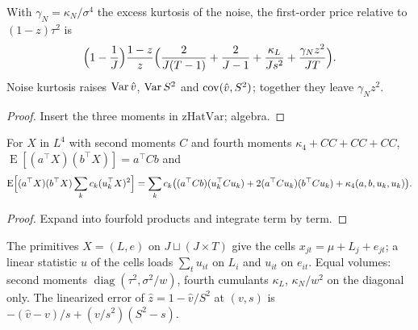 \begin{theorem}\label{thm:bsPrice_balanced_cumulants}
  \leanok
  With $\gamma_N = \kappa_N/\sigma^4$ the excess kurtosis of the noise, the first-order price relative to
  $(1 - z)\tau^2$ is
  \[ \Bigl(1 - \frac1J\Bigr)\frac{1 - z}z\Bigl(\frac2{J(T - 1)} + \frac2{J - 1} + \frac{\kappa_L}{Js^2}
     + \frac{\gamma_Nz^2}{JT}\Bigr). \]
  Noise kurtosis raises $\operatorname{Var}\hat v$, $\operatorname{Var} S^2$ and $\operatorname{cov}(\hat v, S^2)$; together they leave $\gamma_Nz^2$.
\end{theorem}
\begin{proof}
  \leanok
  Insert the three moments in $\mathrm{zHatVar}$; algebra.
\end{proof}

\begin{lemma}\label{lem:integral_lin_lin_sumSq}
  \leanok
  For $X$ in $L^4$ with second moments $C$ and fourth moments $\kappa_4 + CC + CC + CC$,
  $\operatorname{E}[(a^\top X)(b^\top X)] = a^\top Cb$ and
  \[ \operatorname{E}\Bigl[(a^\top X)(b^\top X)\sum_k c_k(u_k^\top X)^2\Bigr]
     = \sum_k c_k\bigl((a^\top Cb)(u_k^\top Cu_k) + 2(a^\top Cu_k)(b^\top Cu_k) + \kappa_4(a, b, u_k, u_k)\bigr). \]
\end{lemma}
\begin{proof}
  \leanok
  Expand into fourfold products and integrate term by term.
\end{proof}

\begin{definition}\label{def:primCells}
  \leanok
  The primitives $X = (L, e)$ on $J \sqcup (J\times T)$ give the cells $x_{jt} = \mu + L_j + e_{jt}$; a linear
  statistic $u$ of the cells loads $\sum_tu_{it}$ on $L_i$ and $u_{it}$ on $e_{it}$. Equal volumes: second
  moments $\operatorname{diag}(\tau^2, \sigma^2/w)$, fourth cumulants $\kappa_L$, $\kappa_N/w^2$ on the diagonal only.
  The linearized error of $\hat z = 1 - \hat v/S^2$ at $(v, s)$ is $-(\hat v - v)/s + (v/s^2)(S^2 - s)$.
\end{definition}

